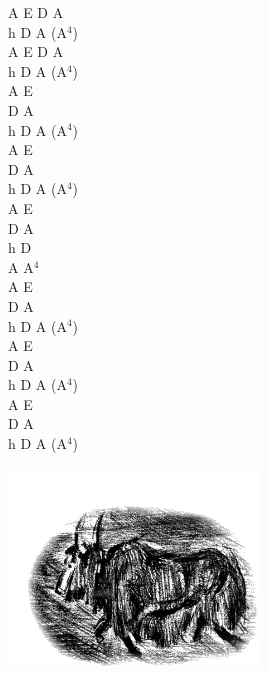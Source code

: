 \documentclass[a5paper, 10pt]{book}
\begin{document}
\begin{minipage}[t]{0.25\textwidth}
A E D A\\
h D A (A$^4$)\\
A E D A\\
h D A (A$^4$)\\

A E\\
D A\\
h D A (A$^4$)\\

A E\\
D A\\
h D A (A$^4$)\\

A E\\
D A\\
h D\\
A A$^4$\\
A E\\
D A\\
h D A (A$^4$)\\

A E\\
D A\\
h D A (A$^4$)\\

A E\\
D A\\
h D A (A$^4$)\\
\end{minipage}
\includegraphics[width=0.5\textwidth,center]{images/jak.png}\\


\newpage
\end{document}
